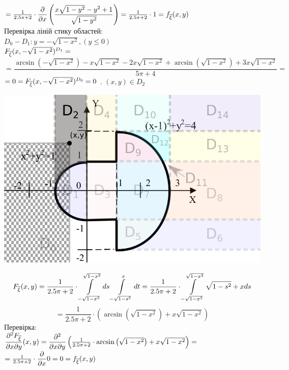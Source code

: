 \documentclass[14pt,a4paper]{scrartcl}
\theoremstyle{definition}
\theoremstyle{remark}
\theoremstyle{definition}
\theoremstyle{definition}
\begin{document}
$ = \frac{1}{2.5\pi + 2} \cdot \dfrac{\partial}{\partial x} \left( \dfrac{x\sqrt{1-y^2}-y^2+1}{\sqrt{1-y^2}} \right) =\frac{1}{2.5\pi + 2} \cdot 1  =f_{\overline{\xi}} (x,y)$\\
Перевірка ліній стику областей:\\
$D_0 - D_1: y = -\sqrt{1- x^2}, (y \leq 0)$\\
$ F_{\overline{\xi}} (x,-\sqrt{1- x^2})^{D_1} = $\\
$=\dfrac{\arcsin\left(-\sqrt{1-x^2}\right)-x\sqrt{1-x^2}-2x\sqrt{1-x^2}+\arcsin\left(\sqrt{1-x^2}\right)+3x\sqrt{1-x^2}}{5\pi + 4} =$
\\$= 0= F_{\overline{\xi}} (x,-\sqrt{1- x^2})^{D_0} = 0$
. $(x,y) \in D_2$
\begin{center} \includegraphics[scale=0.4]{assets/zone32.png} \end{center}
$$
F_{\overline{\xi}} (x,y) =  \frac{1}{2.5\pi + 2} \cdot  \int\limits_{-\sqrt{1- x^2}}^{\sqrt{1- x^2}}{ds  \int\limits_{-\sqrt{1-s^2}}^{x}{dt}} =
\frac{1}{2.5\pi + 2} \cdot  \int\limits_{-\sqrt{1- x^2}}^{\sqrt{1- x^2}}{\sqrt{1-s^2}+xds  }
$$
$$
= \frac{1}{2.5\pi + 2} \cdot \left( \arcsin\left(\sqrt{1-x^2}\right)+x\sqrt{1-x^2} \right)
$$
Перевірка:\\
$\dfrac{\partial^2 F_{\overline{\xi}}}{\partial x \partial y}(x,y) = \dfrac{\partial^2}{\partial x \partial y} \left( \frac{1}{2.5\pi + 2} \cdot\arcsin\left(\sqrt{1-x^2}\right)+x\sqrt{1-x^2} \right) =$\\
$ = \frac{1}{2.5\pi + 2} \cdot \dfrac{\partial}{\partial x} 0 = 0 =f_{\overline{\xi}} (x,y)$\\
\end{document}
